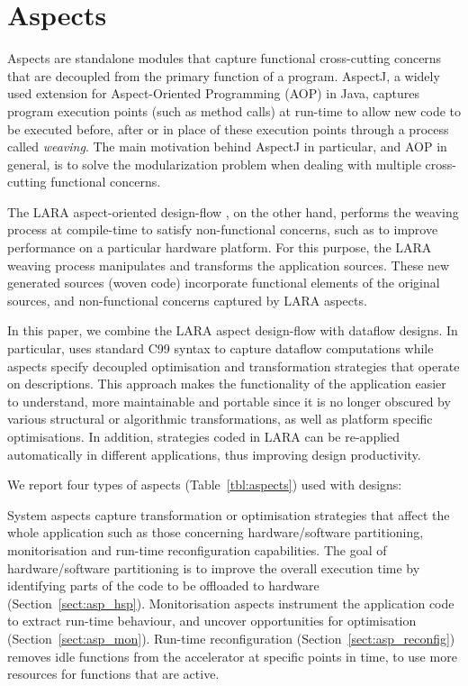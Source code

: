 \section{Aspects}
\label{sec:aspects}

Aspects are standalone modules that capture functional cross-cutting
concerns that are decoupled from the primary function of a
program. AspectJ\cite{Kiczales:2005:AP:1062455.1062640}, a widely
used extension for Aspect-Oriented Programming (AOP) in Java, captures
program execution points (such as method calls) at run-time to allow
new code to be executed before, after or in place of these execution
points through a process called \emph{weaving}. The main motivation
behind AspectJ in particular, and AOP in general, is to solve the
modularization problem when dealing with multiple cross-cutting
functional concerns.

The LARA aspect-oriented
design-flow \cite{Cardoso:Carvalho:Cutinho:Luk:Nobre:Diniz:Petrov:2012},
on the other hand, performs the weaving process at compile-time to
satisfy non-functional concerns, such as to improve performance on a
particular hardware platform. For this purpose, the LARA weaving
process manipulates and transforms the application sources. These new
generated sources (woven code) incorporate functional elements of the
original sources, and non-functional concerns captured by LARA
aspects.

In this paper, we combine the LARA aspect design-flow with \MAXC{}
dataflow designs. In particular, \MAXC{} uses standard C99 syntax to
capture dataflow computations while aspects specify decoupled
optimisation and transformation strategies that operate on \MAXC{}
descriptions. This approach makes the functionality of the application
easier to understand, more maintainable and portable since it is no
longer obscured by various structural or algorithmic transformations,
as well as platform specific optimisations. In addition, strategies
coded in LARA can be re-applied automatically in different
applications, thus improving design productivity.

We report four types of aspects (Table~\ref{tbl:aspects}) used with \MAXC{} designs:

\vspace*{0.5ex}
 System aspects capture transformation or optimisation strategies that affect the whole application such as those concerning
hardware/software partitioning, monitorisation and run-time reconfiguration
capabilities. The goal of hardware/software partitioning is to improve the overall
execution time by identifying parts of the code to be offloaded to hardware (Section~\ref{sect:asp_hsp}). Monitorisation aspects instrument the application code to extract run-time behaviour, and uncover opportunities for optimisation (Section~\ref{sect:asp_mon}). Run-time reconfiguration (Section~\ref{sect:asp_reconfig}) removes idle functions from the accelerator at specific points in time, to use more resources for functions that are active.

